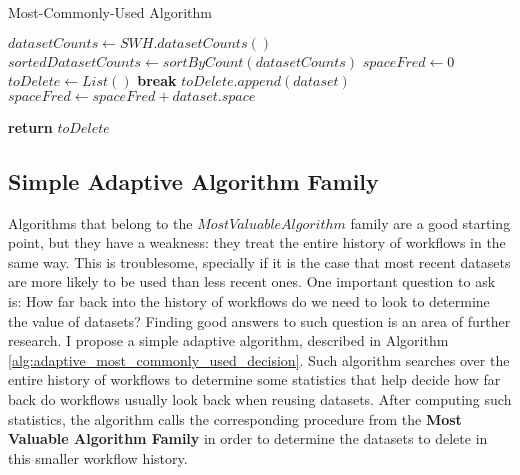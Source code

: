 \begin{algorithm}
\begin{singlespace}
\caption{Most-Commonly-Used Algorithm}
\label{alg:most_commonly_used_decision}
\begin{algorithmic}[1]
	\State $datasetCounts \gets SWH.datasetCounts()$
	\State $sortedDatasetCounts \gets sortByCount(datasetCounts)$
	\State $spaceFred \gets 0$
	\State $toDelete \gets List()$
			\State \textbf{break}
		\EndIf	
		\State $toDelete.append(dataset)$
		\State $spaceFred \gets spaceFred + dataset.space$
	\EndFor
	
	\State \textbf{return} $toDelete$
\EndProcedure
\end{algorithmic}
\end{singlespace}
\end{algorithm}

\subsection{Simple Adaptive Algorithm Family}
Algorithms that belong to the $Most Valuable Algorithm$ family are a good starting point, but they have a weakness: they treat the entire history of workflows in the same way.  This is troublesome, specially if it is the case that most recent datasets are more likely to be used than less recent ones.  One important question to ask is: How far back into the history of workflows do we need to look to determine the value of datasets? Finding good answers to such question is an area of further research.  I propose a simple adaptive algorithm, described in Algorithm \ref{alg:adaptive_most_commonly_used_decision}. Such algorithm searches over the entire history of workflows to determine some statistics that help decide how far back do workflows usually look back when reusing datasets. After computing such statistics, the algorithm calls the corresponding procedure from the \textbf{Most Valuable Algorithm Family} in order to determine the datasets to delete in this smaller workflow history.

